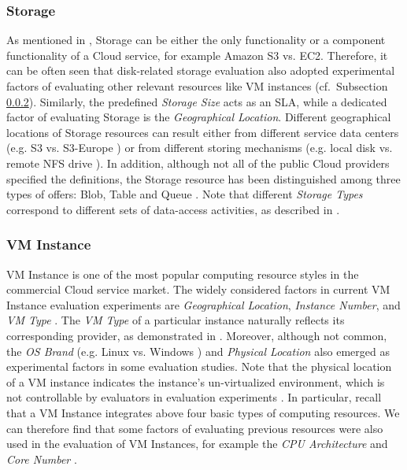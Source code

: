 \documentclass[10pt, conference, compsocconf]{IEEEtran}
\begin{document}
\subsubsection{Storage}
As mentioned in \cite{Li_OBrien_2012a}, Storage can be either the only functionality or a component functionality of a Cloud service, for example Amazon S3 vs. EC2. Therefore, it can be often seen that disk-related storage evaluation also adopted experimental factors of evaluating other relevant resources like VM instances (cf.~Subsection \ref{III-VM}). Similarly, the predefined \textit{Storage Size} acts as an SLA, while a dedicated factor of evaluating Storage is the \textit{Geographical Location}. Different geographical locations of Storage resources can result either from different service data centers (e.g. S3 vs. S3-Europe \cite{Palankar_Iamnitchi_2008}) or from different storing mechanisms (e.g. local disk vs. remote NFS drive \cite{Sobel_Subramanyam_2008}). In addition, although not all of the public Cloud providers specified the definitions, the Storage resource has been distinguished among three types of offers: Blob, Table and Queue \cite{Li_Yang_2010}. Note that different \textit{Storage Types} correspond to different sets of data-access activities, as described in \cite{Li_OBrien_2012b}. 

\subsubsection{VM Instance}
\label{III-VM}
VM Instance is one of the most popular computing resource styles in the commercial Cloud service market. The widely considered factors in current VM Instance evaluation experiments are \textit{Geographical Location}, \textit{Instance Number}, and \textit{VM Type} \cite{Bientinesi_Iakymchuk_2010,Hill_Humphrey_2009,Hill_Li_2010,Iosup_Yigitbasi_2010,Li_Yang_2010,Ostermann_Iosup_2009,Stantchev_2009}. The \textit{VM Type} of a particular instance naturally reflects its corresponding provider, as demonstrated in \cite{Li_Yang_2010}. Moreover, although not common, the \textit{OS Brand} (e.g. Linux vs. Windows \cite{Li_Yang_2010}) and \textit{Physical Location} \cite{Dejun_Pierre_2009} also emerged as experimental factors in some evaluation studies. Note that the physical location of a VM instance indicates the instance's un-virtualized environment, which is not controllable by evaluators in evaluation experiments \cite{Dejun_Pierre_2009}. In particular, recall that a VM Instance integrates above four basic types of computing resources. We can therefore find that some factors of evaluating previous resources were also used in the evaluation of VM Instances, for example the \textit{CPU Architecture} and \textit{Core Number} \cite{Bientinesi_Iakymchuk_2010,Ostermann_Iosup_2009}.
\end{document}
